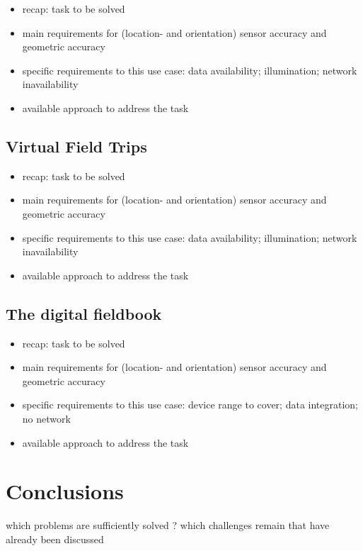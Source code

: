 \documentclass[review]{elsarticle}
\begin{document}
\begin{itemize}
\item recap: task to be solved
\item main requirements for (location- and orientation) sensor accuracy and geometric accuracy
\item specific requirements to this use case: data availability; illumination; network inavailability
\item available approach to address the task
\end{itemize}

\subsection{Virtual Field Trips}

\begin{itemize}
\item recap: task to be solved
\item main requirements for (location- and orientation) sensor accuracy and geometric accuracy
\item specific requirements to this use case: data availability; illumination; network inavailability
\item available approach to address the task
\end{itemize}

\subsection{The digital fieldbook}

\begin{itemize}
\item recap: task to be solved
\item main requirements for (location- and orientation) sensor accuracy and geometric accuracy
\item specific requirements to this use case: device range to cover; data integration; no network
\item available approach to address the task
\end{itemize}


\section{Conclusions}
\label{sec:conclusions}

which problems are sufficiently solved ? 
which challenges remain that have already been discussed
\end{document}
